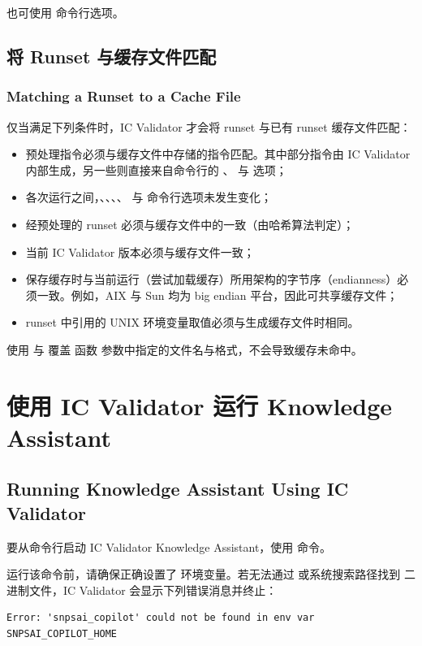 也可使用  命令行选项。

\subsection{将 Runset 与缓存文件匹配}
\subsubsection*{Matching a Runset to a Cache File}

仅当满足下列条件时，IC Validator 才会将 runset 与已有 runset 缓存文件匹配：
\begin{itemize}
  \item 预处理指令必须与缓存文件中存储的指令匹配。其中部分指令由 IC Validator 内部生成，另一些则直接来自命令行的 、 与  选项；
  \item 各次运行之间，、、、、 与  命令行选项未发生变化；
  \item 经预处理的 runset 必须与缓存文件中的一致（由哈希算法判定）；
  \item 当前 IC Validator 版本必须与缓存文件一致；
  \item 保存缓存时与当前运行（尝试加载缓存）所用架构的字节序（endianness）必须一致。例如，AIX 与 Sun 均为 big endian 平台，因此可共享缓存文件；
  \item runset 中引用的 UNIX 环境变量取值必须与生成缓存文件时相同。
\end{itemize}

\begin{noteBox}
使用  与  覆盖  函数  参数中指定的文件名与格式，不会导致缓存未命中。
\end{noteBox}

\section{使用 IC Validator 运行 Knowledge Assistant}
\subsection*{Running Knowledge Assistant Using IC Validator}

要从命令行启动 IC Validator Knowledge Assistant，使用  命令。

运行该命令前，请确保正确设置了  环境变量。若无法通过  或系统搜索路径找到  二进制文件，IC Validator 会显示下列错误消息并终止：
\begin{lstlisting}
Error: 'snpsai_copilot' could not be found in env var SNPSAI_COPILOT_HOME
\end{lstlisting}

